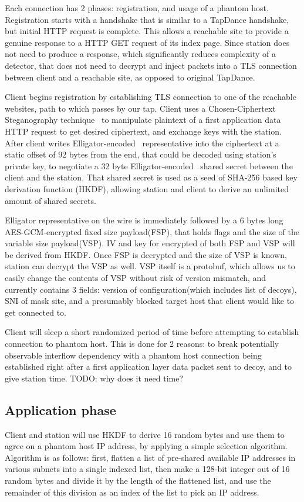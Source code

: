 \documentclass[sigconf]{acmart}
\begin{document}
Each \scheme connection has 2 phases: registration, and usage of a phantom host.
Registration starts with a handshake that is similar to a TapDance handshake,
but initial HTTP request is complete.
This allows a reachable site to provide a genuine response
to a HTTP GET request of its index page.
Since station does not need to produce a response,
which significantly reduces complexity of a detector,
that does not need to decrypt and inject packets into a TLS connection between
client and a reachable site, as opposed to original TapDance.

Client begins registration by establishing TLS connection
to one of the reachable websites,
path to which passes by our tap.
Client uses a Chosen-Ciphertext Steganography technique~\cite{tapdance14} to manipulate
plaintext of a first application data HTTP request
to get desired ciphertext,
and exchange keys with the station.
After client writes Elligator-encoded~\cite{elligator} representative into the ciphertext at a static offset of 92 bytes from the end,
that could be decoded using station's private key,
to negotiate a 32 byte Elligator-encoded~\cite{elligator} shared secret between the client and the station.
That shared secret is used as a seed of SHA-256 based key derivation function (HKDF),
allowing station and client to derive an unlimited amount of shared secrets.

Elligator representative on the wire is immediately followed by a 6 bytes long AES-GCM-encrypted
fixed size payload(FSP), that holds flags and the size of the variable size payload(VSP).
IV and key for encrypted of both FSP and VSP will be derived from HKDF.
Once FSP is decrypted and the size of VSP is known, station can decrypt the VSP as well.
VSP itself is a protobuf, which allows us to easily change the contents of VSP without risk of version mismatch, and currently contains 3 fields: version of configuration(which includes list of decoys), SNI of mask site, and a presumably blocked target host that client would like to get connected to.

Client will sleep a short randomized period of time before attempting to establish connection to phantom host.
This is done for 2 reasons: to break potentially observable interflow dependency with a phantom host connection being established right after a first application layer data packet sent to decoy,
and to give station time.
TODO: why does it need time?

\subsection{Application phase}
Client and station will use HKDF to derive 16 random bytes and use them to
agree on a phantom host IP address, by applying a simple selection algorithm.
Algorithm is as follows: first, flatten a list of pre-shared available IP
addresses in various subnets into a single indexed list, then make a 128-bit
integer out of 16 random bytes and divide it by the length
of the flattened list, and use the remainder of this division as an index
of the list to pick an IP address.
\end{document}
